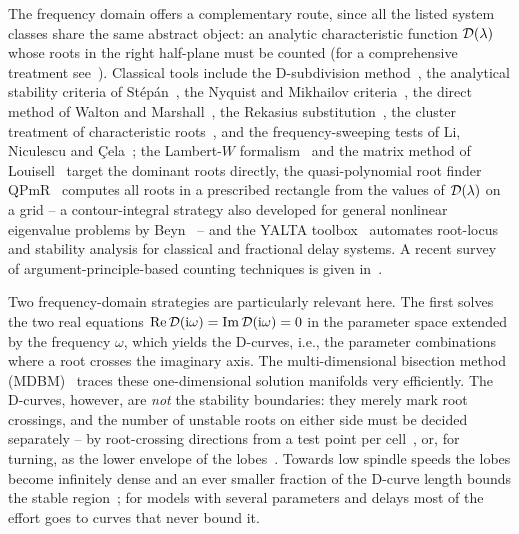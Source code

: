 The frequency domain offers a complementary route, since all the listed
system classes share the same abstract object: an analytic characteristic
function $\mathcal{D}(\lambda)$ whose roots in the right half-plane must be counted
(for a comprehensive treatment see~\cite{gu2003stability}).
Classical tools include the D-subdivision method~\cite{neimark1949decomposition},
the analytical stability criteria of St\'ep\'an~\cite{stepan1989retarded},
the Nyquist and Mikhailov criteria~\cite{nyquist1932regeneration,mikhailov1938method},
the direct method of Walton and Marshall~\cite{walton1987direct}, the
Rekasius substitution~\cite{rekasius1980stability}, the cluster treatment
of characteristic roots~\cite{olgac2002exact}, and the frequency-sweeping
tests of Li, Niculescu and \c{C}ela~\cite{li2015analytic}; the Lambert-$W$
formalism~\cite{yi2010timedelay} and the matrix method of
Louisell~\cite{louisell2001matrix} target the dominant roots directly, the
quasi-polynomial root finder QPmR~\cite{vyhlidal2009mapping,vyhlidal2014qpmr}
computes all roots in a prescribed rectangle from the values of
$\mathcal{D}(\lambda)$ on a grid -- a contour-integral strategy also developed for
general nonlinear eigenvalue problems by Beyn~\cite{beyn2012integral} --
and the YALTA toolbox~\cite{avanessoff2013yalta} automates root-locus and
stability analysis for classical and fractional delay systems. A recent
survey of argument-principle-based counting techniques is given
in~\cite{niculescu2023counting}.

Two frequency-domain strategies are particularly relevant here. The first
solves the two real equations $\operatorname{Re}\mathcal{D}(\mathrm{i}\omega)=\operatorname{Im}\mathcal{D}(\mathrm{i}\omega)=0$
in the parameter space extended by the frequency $\omega$, which
yields the D-curves, i.e., the parameter combinations where a root crosses
the imaginary axis. The multi-dimensional bisection method
(MDBM)~\cite{bachrathy2012bisection,bachrathy2025mdbm} traces these
one-dimensional solution manifolds very efficiently. The D-curves, however,
are \emph{not} the stability boundaries: they merely mark root crossings,
and the number of unstable roots on either side must be decided separately --
by root-crossing directions from a test point per
cell~\cite{stepan1989retarded,olgac2002exact}, or, for turning, as the lower
envelope of the lobes~\cite{tlusty1963stability,stepan2001modelling}. Towards
low spindle speeds the lobes become infinitely dense and an ever smaller
fraction of the D-curve length bounds the stable
region~\cite{insperger2003stability,bachrathy2013improved}; for models with
several parameters and delays most of the effort goes to curves that never
bound it.

